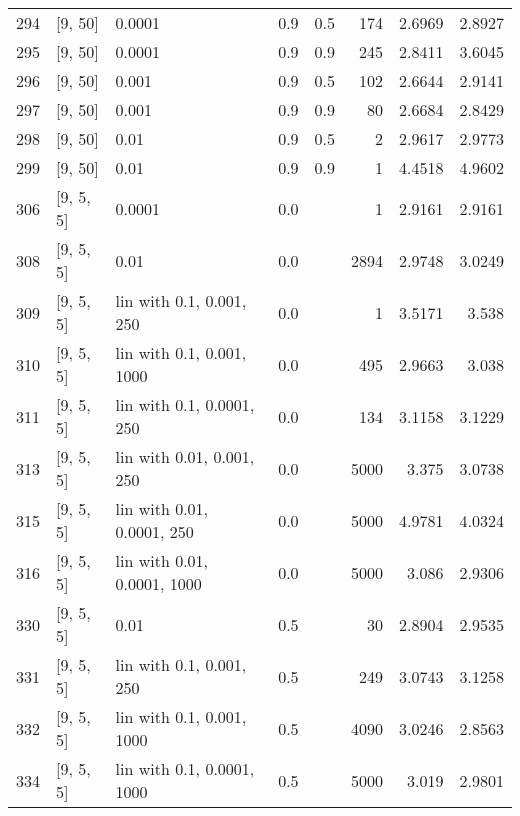 \begin{longtable}{lllrrrrr}
  294 &            [9, 50] &                      0.0001 &      0.9 & 0.5 &  174 &   2.6969 &   2.8927 \\
  295 &            [9, 50] &                      0.0001 &      0.9 & 0.9 &  245 &   2.8411 &   3.6045 \\
  296 &            [9, 50] &                       0.001 &      0.9 & 0.5 &  102 &   2.6644 &   2.9141 \\
  297 &            [9, 50] &                       0.001 &      0.9 & 0.9 &   80 &   2.6684 &   2.8429 \\
  298 &            [9, 50] &                        0.01 &      0.9 & 0.5 &    2 &   2.9617 &   2.9773 \\
  299 &            [9, 50] &                        0.01 &      0.9 & 0.9 &    1 &   4.4518 &   4.9602 \\
  306 &          [9, 5, 5] &                      0.0001 &      0.0 &     &    1 &   2.9161 &   2.9161 \\
  308 &          [9, 5, 5] &                        0.01 &      0.0 &     & 2894 &   2.9748 &   3.0249 \\
  309 &          [9, 5, 5] &    lin with 0.1, 0.001, 250 &      0.0 &     &    1 &   3.5171 &    3.538 \\
  310 &          [9, 5, 5] &   lin with 0.1, 0.001, 1000 &      0.0 &     &  495 &   2.9663 &    3.038 \\
  311 &          [9, 5, 5] &   lin with 0.1, 0.0001, 250 &      0.0 &     &  134 &   3.1158 &   3.1229 \\
  313 &          [9, 5, 5] &   lin with 0.01, 0.001, 250 &      0.0 &     & 5000 &    3.375 &   3.0738 \\
  315 &          [9, 5, 5] &  lin with 0.01, 0.0001, 250 &      0.0 &     & 5000 &   4.9781 &   4.0324 \\
  316 &          [9, 5, 5] & lin with 0.01, 0.0001, 1000 &      0.0 &     & 5000 &    3.086 &   2.9306 \\
  330 &          [9, 5, 5] &                        0.01 &      0.5 &     &   30 &   2.8904 &   2.9535 \\
  331 &          [9, 5, 5] &    lin with 0.1, 0.001, 250 &      0.5 &     &  249 &   3.0743 &   3.1258 \\
  332 &          [9, 5, 5] &   lin with 0.1, 0.001, 1000 &      0.5 &     & 4090 &   3.0246 &   2.8563 \\
  334 &          [9, 5, 5] &  lin with 0.1, 0.0001, 1000 &      0.5 &     & 5000 &    3.019 &   2.9801 \\

\end{longtable}
